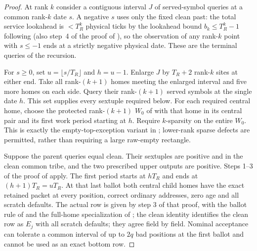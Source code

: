 \begin{proof}
At rank \(k\) consider a contiguous interval \(J\) of served-symbol queries at a common rank-\(k\) date \(s\). A negative \(s\) uses only the fixed clean past: the total service lookahead is \(<T_{R}^{k}\) physical ticks by the lookahead bound \(b_k\le T_{R}^k-1\) following \cite[Definition~\ref*{cl:def:observations}]{DMNoise1D2026} (also step~4 of the proof of \cite[Lemma~\ref*{cl:lem:two-period}]{DMNoise1D2026}), so the observation of any rank-\(k\) point with \(s\le -1\) ends at a strictly negative physical date. These are the terminal queries of the recursion.

For \(s\ge 0\), set \(u=\lfloor s/T_{R}\rfloor\) and \(h=u-1\). Enlarge \(J\) by \(T_{R}+2\) rank-\(k\) sites at either end. Take all rank-\((k+1)\) homes meeting the enlarged interval and five more homes on each side. Query their rank-\((k+1)\) served symbols at the single date \(h\). This set supplies every sextuple required below. For each required central home, choose the protected rank-\((k+1)\) \(W_0\) of \cite[Lemma~\ref*{cl:lem:two-period}]{DMNoise1D2026} with that home in its central pair and its first work period starting at \(h\). Require \(k\)-sparsity on the entire \(W_0\). This is exactly the empty-top-exception variant in \cite[Lemma~\ref*{cl:lem:two-period}]{DMNoise1D2026}; lower-rank sparse defects are permitted, rather than requiring a large raw-empty rectangle.

Suppose the parent queries equal clean. Their sextuples are positive and in the clean common tribe, and the two prescribed upper outputs are positive. Steps 1--3 of the proof of \cite[Lemma~\ref*{cl:lem:two-period}]{DMNoise1D2026} apply. The first period starts at \(hT_{R}\) and ends at \((h+1)T_{R}=uT_{R}\). At that last ballot both central child homes have the exact retained packet at every position, correct ordinary addresses, zero age and all scratch defaults. The actual row is given by step 3 of that proof, with the ballot rule of \cite[Section~\ref*{cl:sec:verifier}]{DMNoise1D2026} and the full-home specialization of \cite[Lemma~\ref*{cl:lem:endpoint}]{DMNoise1D2026}; the clean identity \cite[Lemma~\ref*{cl:lem:clean}]{DMNoise1D2026} identifies the clean row as \(E_{j}\) with all scratch defaults; they agree field by field. Nominal acceptance can tolerate a common interval of up to \(2q\) bad positions at the first ballot and cannot be used as an exact bottom row.


\end{proof}
